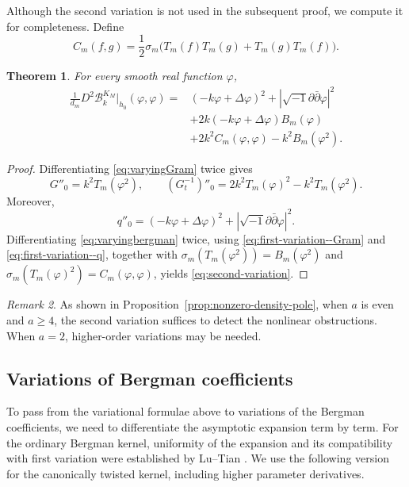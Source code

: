 \documentclass[11pt,reqno]{amsart}
\newtheorem{theorem}{Theorem}[section]
\theoremstyle{corollary}
\theoremstyle{conjecture}
\theoremstyle{assumption}
\theoremstyle{proposition}
\theoremstyle{remark}
\newtheorem{remark}[theorem]{Remark}
\numberwithin{equation}{section}
\newcommand{\ii}{\ensuremath{\sqrt{-1}}}
\newcommand{\pa}{\partial}
\newcommand{\pp}{\bar\partial}
\begin{document}
Although the second variation is not used in the subsequent proof, we compute it for completeness. Define
\[
C_m(f,g)=\frac12\sigma_m\bigl(T_m(f)T_m(g)+T_m(g)T_m(f)\bigr).
\]

\begin{theorem}
\label{thm:second-variation}
For every smooth real function $\varphi$,
\begin{equation}\label{eq:second-variation}
\begin{aligned}
\frac{1}{d_m}D^2\mathcal B_k^{K_M}|_{h_0}(\varphi,\varphi)={}&(-k\varphi+\Delta\varphi)^2+|\ii\pa\pp\varphi|^2\\
&+2k(-k\varphi+\Delta\varphi)B_m(\varphi)\\
&+2k^2C_m(\varphi,\varphi)-k^2B_m(\varphi^2).
\end{aligned}
\end{equation}
\end{theorem}

\begin{proof}
Differentiating \eqref{eq:varyingGram} twice gives
\[
G''_0=k^2T_m(\varphi^2),\qquad (G_t^{-1})''_0=2k^2T_m(\varphi)^2-k^2T_m(\varphi^2).
\]
Moreover,
\[
q''_0=(-k\varphi+\Delta\varphi)^2+|\ii\pa\pp\varphi|^2.
\]
Differentiating \eqref{eq:varyingbergman} twice, using \eqref{eq:first-variation--Gram} and \eqref{eq:first-variation--q}, together with
$\sigma_m(T_m(\varphi^2))=B_m(\varphi^2)$ and $\sigma_m(T_m(\varphi)^2)=C_m(\varphi,\varphi)$, yields \eqref{eq:second-variation}.
\end{proof}

\begin{remark}
As shown in Proposition~\ref{prop:nonzero-density-pole}, when $a$ is even and $a\geq 4$, the second variation suffices to detect the nonlinear obstructions. When $a=2$, higher-order variations may be needed.
\end{remark}

\subsection{Variations of Bergman coefficients}
\label{subsec:differentiating-expansion}

To pass from the variational formulae above to variations of the Bergman coefficients, we need to differentiate the asymptotic expansion term by term. For the ordinary Bergman kernel, uniformity of the expansion and its compatibility with first variation were established by Lu--Tian \cite[Proposition~4.1 and Theorems~4.1--4.2]{LuTian2004}. We use the following version for the canonically twisted kernel, including higher parameter derivatives.
\end{document}

